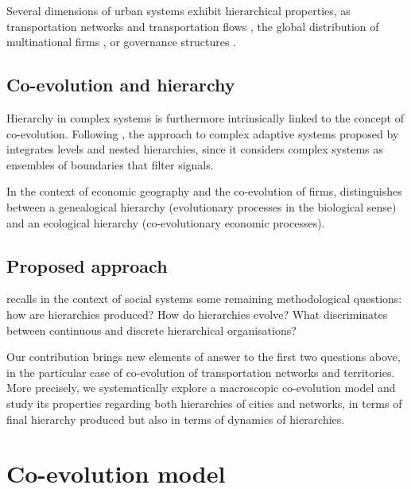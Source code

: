 \documentclass[english,fleqn,allpages]{ISTE_science}[2018/07/30]
\begin{document}
Several dimensions of urban systems exhibit hierarchical properties, as transportation networks and transportation flows \citep{jiang2009street}, the global distribution of multinational firms \citep{godfrey1999ranking}, or governance structures \citep{li2015administrative}.





\subsection{Co-evolution and hierarchy}



Hierarchy in complex systems is furthermore intrinsically linked to the concept of co-evolution. Following \cite{lane2006hierarchy}, the approach to complex adaptive systems proposed by \cite{holland2012signals} integrates levels and nested hierarchies, since it considers complex systems as ensembles of boundaries that filter signals. 

In the context of economic geography and the co-evolution of firms, \cite{volberda2003co} distinguishes between a genealogical hierarchy (evolutionary processes in the biological sense) and an ecological hierarchy (co-evolutionary economic processes). %



\subsection{Proposed approach}

\cite{pumain2006introduction} recalls in the context of social systems some remaining methodological questions: how are hierarchies produced? How do hierarchies evolve? What discriminates between continuous and discrete hierarchical organisations?

Our contribution brings new elements of answer to the first two questions above, in the particular case of co-evolution of transportation networks and territories. More precisely, we systematically explore a macroscopic co-evolution model and study its properties regarding both hierarchies of cities and networks, in terms of final hierarchy produced but also in terms of dynamics of hierarchies.


\section{Co-evolution model}
\end{document}
